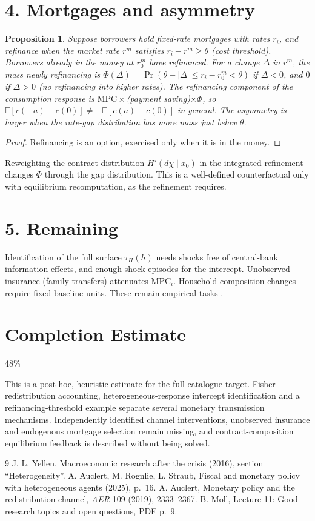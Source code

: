 \documentclass[11pt]{article}
\newtheorem{proposition}[theorem]{Proposition}
\theoremstyle{definition}
\begin{document}
\section*{4. Mortgages and asymmetry}
\begin{proposition}\label{prop:refi}
Suppose borrowers hold fixed-rate mortgages with rates $r_i$, and refinance when the market rate $r^m$ satisfies
$r_i-r^m\ge\theta$ (cost threshold). Borrowers already in the money at $r^m_0$ have refinanced. For a change $\Delta$ in $r^m$, the mass newly refinancing is
$\Phi(\Delta)=\Pr(\theta-|\Delta|\le r_i-r^m_0<\theta)$ if $\Delta<0$, and $0$ if $\Delta>0$ (no refinancing into higher rates).
The refinancing component of the consumption response is $\mathrm{MPC}\times$(payment saving)$\times\Phi$, so
$\mathbb E[c(-a)-c(0)]\ne-\mathbb E[c(a)-c(0)]$ in general. The asymmetry is larger when the rate-gap distribution has more
mass just below $\theta$.
\end{proposition}
\begin{proof}
Refinancing is an option, exercised only when it is in the money.
\end{proof}
Reweighting the contract distribution $H'(d\chi\mid x_0)$ in the integrated refinement changes $\Phi$ through the gap
distribution. This is a well-defined counterfactual only with equilibrium recomputation, as the refinement requires.

\section*{5. Remaining}
Identification of the full surface $\tau_H(h)$ needs shocks free of central-bank information effects, and enough shock
episodes for the intercept. Unobserved insurance (family transfers) attenuates $\mathrm{MPC}_i$. Household composition changes
require fixed baseline units. These remain empirical tasks \cite{yellen,moll}.

\section{Completion Estimate}
48\%

This is a post hoc, heuristic estimate for the full catalogue target.
Fisher redistribution accounting, heterogeneous-response intercept identification and a refinancing-threshold example separate several monetary transmission mechanisms. Independently identified channel interventions, unobserved insurance and endogenous mortgage selection remain missing, and contract-composition equilibrium feedback is described without being solved.

\begin{thebibliography}{9}
 J. L. Yellen, Macroeconomic research after the crisis (2016), section ``Heterogeneity''.
 A. Auclert, M. Rognlie, L. Straub, Fiscal and monetary policy with heterogeneous agents (2025), p.~16.
 A. Auclert, Monetary policy and the redistribution channel, \emph{AER} 109 (2019), 2333--2367.
 B. Moll, Lecture 11: Good research topics and open questions, PDF p.~9.
\end{thebibliography}
\end{document}
